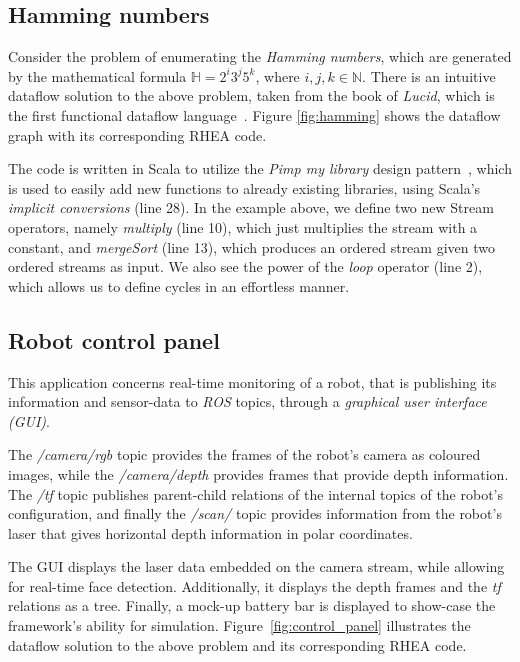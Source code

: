 \documentclass[sigplan,screen]{acmart}
\begin{document}
\subsection{Hamming numbers}

Consider the problem of enumerating the
\textit{Hamming numbers}, which are generated by the mathematical formula
$\mathbb{H} = 2^i3^j5^k$, where $i,j,k \in \mathbb{N}$. There is an intuitive
dataflow solution to the above problem, taken from the book of \textit{Lucid},
which is the first functional dataflow language~\cite{lucid}. Figure
\ref{fig:hamming} shows the dataflow graph with its corresponding \textsc{RHEA}
code.


The code is written in Scala to utilize the \textit{Pimp my library} design
pattern~\cite{pimp}, which is used to easily add new functions to already
existing libraries, using Scala's \textit{implicit conversions} (line 28). In
the example above, we define two new Stream operators, namely \textit{multiply}
(line 10), which just multiplies the stream with a constant, and
\textit{mergeSort} (line 13), which produces an ordered stream given two ordered
streams as input. We also see the power of the \textit{loop} operator (line 2),
which allows us to define cycles in an effortless manner.

\subsection{Robot control panel}

This application concerns real-time monitoring of a robot, that is publishing
its information and sensor-data to \textit{ROS} topics, through a
\textit{graphical user interface (GUI)}.

The \textit{/camera/rgb} topic provides the frames of the robot's camera as
coloured images, while the \textit{/camera/depth} provides frames that provide
depth information. The \textit{/tf} topic publishes parent-child relations of
the internal topics of the robot's configuration, and finally the
\textit{/scan/} topic provides information from the robot's laser that gives
horizontal depth information in polar coordinates.

The GUI displays the laser data embedded on the camera stream, while allowing
for real-time face detection. Additionally, it displays the depth frames and the
\textit{tf} relations as a tree. Finally, a mock-up battery bar is displayed to
show-case the framework's ability for simulation. Figure~\ref{fig:control_panel}
illustrates the dataflow solution to the above problem and its corresponding
\textsc{RHEA} code.
\end{document}
